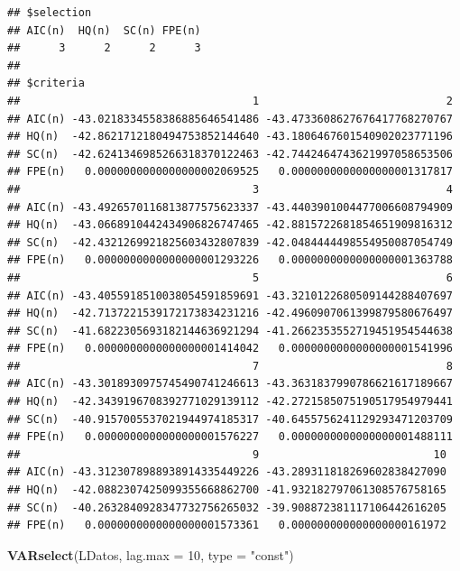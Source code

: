 \documentclass[
]{book}
\newenvironment{Shaded}{\begin{snugshade}}{\end{snugshade}}
\newcommand{\AttributeTok}[1]{\textcolor[rgb]{0.13,0.29,0.53}{#1}}
\newcommand{\DecValTok}[1]{\textcolor[rgb]{0.00,0.00,0.81}{#1}}
\newcommand{\FunctionTok}[1]{\textcolor[rgb]{0.13,0.29,0.53}{\textbf{#1}}}
\newcommand{\NormalTok}[1]{#1}
\newcommand{\StringTok}[1]{\textcolor[rgb]{0.31,0.60,0.02}{#1}}
\begin{document}
\begin{verbatim}
## $selection
## AIC(n)  HQ(n)  SC(n) FPE(n) 
##      3      2      2      3 
## 
## $criteria
##                                    1                             2
## AIC(n) -43.0218334558386885646541486 -43.4733608627676417768270767
## HQ(n)  -42.8621712180494753852144640 -43.1806467601540902023771196
## SC(n)  -42.6241346985266318370122463 -42.7442464743621997058653506
## FPE(n)   0.0000000000000000002069525   0.0000000000000000001317817
##                                    3                             4
## AIC(n) -43.4926570116813877575623337 -43.4403901004477006608794909
## HQ(n)  -43.0668910442434906826747465 -42.8815722681854651909816312
## SC(n)  -42.4321269921825603432807839 -42.0484444498554950087054749
## FPE(n)   0.0000000000000000001293226   0.0000000000000000001363788
##                                    5                             6
## AIC(n) -43.4055918510038054591859691 -43.3210122680509144288407697
## HQ(n)  -42.7137221539172173834231216 -42.4960907061399879580676497
## SC(n)  -41.6822305693182144636921294 -41.2662353552719451954544638
## FPE(n)   0.0000000000000000001414042   0.0000000000000000001541996
##                                    7                             8
## AIC(n) -43.3018930975745490741246613 -43.3631837990786621617189667
## HQ(n)  -42.3439196708392771029139112 -42.2721585075190517954979441
## SC(n)  -40.9157005537021944974185317 -40.6455756241129293471203709
## FPE(n)   0.0000000000000000001576227   0.0000000000000000001488111
##                                    9                           10
## AIC(n) -43.3123078988938914335449226 -43.289311818269602838427090
## HQ(n)  -42.0882307425099355668862700 -41.932182797061308576758165
## SC(n)  -40.2632840928347732756265032 -39.908872381117106442616205
## FPE(n)   0.0000000000000000001573361   0.000000000000000000161972
\end{verbatim}

\begin{Shaded}
\begin{Highlighting}[]
\FunctionTok{VARselect}\NormalTok{(LDatos, }\AttributeTok{lag.max =} \DecValTok{10}\NormalTok{, }\AttributeTok{type =} \StringTok{"const"}\NormalTok{)}
\end{Highlighting}
\end{Shaded}
\end{document}
